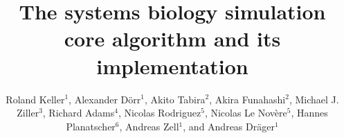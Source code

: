 \documentclass[10pt]{bmc_article}
\newenvironment{bmcformat}{\baselineskip20pt\sloppy\setboolean{publ}{false}}{\baselineskip20pt\sloppy}
\begin{document}
\begin{bmcformat}



\title{The systems biology simulation core algorithm and its implementation}



\author{%
Roland Keller$^{1}$, %
Alexander D\"orr$^{1}$, %
Akito Tabira$^{2}$, %
Akira Funahashi$^{2}$, %
Michael J. Ziller$^{3}$, %
Richard Adams$^{4}$, %
Nicolas Rodriguez$^{5}$, %
Nicolas Le Nov\`{e}re$^{5}$, %
Hannes Planatscher$^{6}$, %
Andreas Zell$^{1}$, %
and Andreas Dr\"ager$^{1}$\correspondingauthor{}%
}


\address{%
\iid(1)Center for Bioinformatics Tuebingen (ZBIT), University of
Tuebingen, T\"ubingen, Germany
\iid(2)Keio University, Graduate School of
Science and Technology, Yokohama, Japan 
\iid(3)Department of Stem Cell and Regenerative Biology, Harvard University,
Cambridge, MA, USA
\iid(4)SynthSys Edinburgh, CH Waddington Building, University of Edinburgh,
Edinburgh EH9 3JD, UK
\iid(5)European Bioinformatics Institute, Wellcome Trust Genome Campus, Hinxton,
Cambridge, UK
\iid(6)Natural and Medical Sciences Institute at the University of Tuebingen,
Reutlingen, Germany}


\end{bmcformat}
\end{document}
